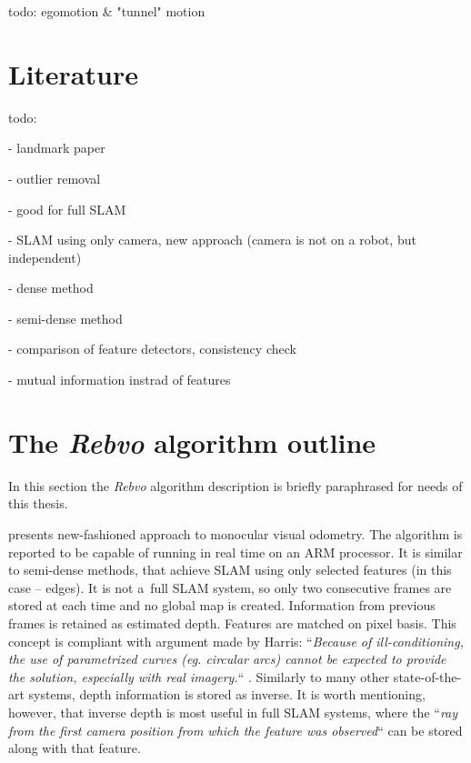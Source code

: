 todo: egomotion \& "tunnel" motion
\cite{vehicle_egomotion} \cite{recovery_of_egomotion}




\section{Literature}
\label{sec:stateoftheart}

todo:

\cite{visual_odometry} - landmark paper

\cite{fast_monocular} \cite{costeira1998multibody} - outlier removal

\cite{spatiotemporal} - good for full SLAM

\cite{a_kalman}

\cite{monoslam} - SLAM using only camera, new approach (camera is not on a robot, but independent)

\cite{mouragnon2006real}

\cite{robust_visual_odometry_estimation} - dense method

\cite{semi_dense} - semi-dense method

\cite{a_stereo_visual} - comparison of feature detectors, consistency check

\cite{gui2015robust} - mutual information instrad of features


\section{The \textit{Rebvo} algorithm outline}
\label{sec:rebvo_outline}

In this section the \textit{Rebvo} algorithm description is briefly paraphrased for needs of this thesis.

\cite{jose2015realtime} presents new-fashioned approach to monocular visual odometry. The algorithm is reported to be capable of running in real time on an ARM processor. It is similar to semi-dense methods, that achieve SLAM using only selected features (in this case -- edges). It is not a~full SLAM system, so only two consecutive frames are stored at each time and no global map is created. Information from previous frames is retained as estimated depth. Features are matched on pixel basis. This concept is compliant with argument made by Harris: ``\textit{Because of ill-conditioning, the use of parametrized curves (eg. circular arcs) cannot be expected to provide the solution, especially with real imagery.}`` \cite{harris}. Similarly to many other state-of-the-art systems, depth information is stored as inverse. It is worth mentioning, however, that inverse depth is most useful in full SLAM systems, where the ``\textit{ray from the first camera position from which the feature was observed}`` \cite{civera2008inverse} can be stored along with that feature.


